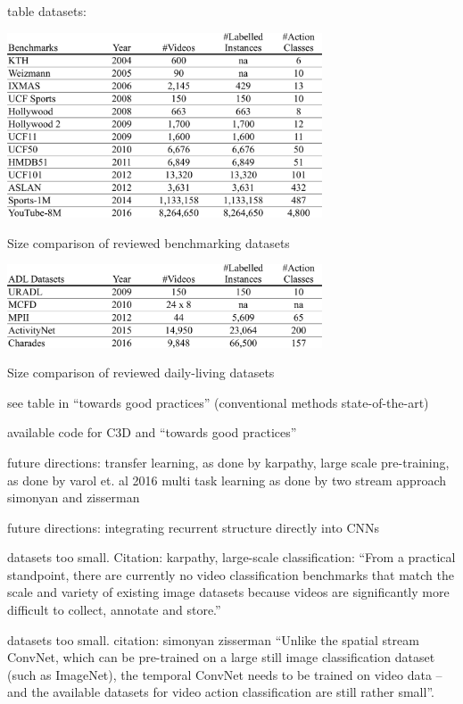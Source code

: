 table datasets:
\begin{table}
    \centering
    \includegraphics[width=0.7\textwidth]{img_evaluation/benchmarks_results}
    \caption{Size comparison of reviewed benchmarking datasets}
    \label{tab:benchmarks_results}
\end{table}

\begin{table}
    \centering
    \includegraphics[width=0.7\textwidth]{img_evaluation/adl_results}
    \caption{Size comparison of reviewed daily-living datasets}
    \label{tab:adl_results}
\end{table}

see table in ``towards good practices'' (conventional methods state-of-the-art)

available code for C3D and ``towards good practices''

future directions: transfer learning, as done by karpathy, large scale
pre-training, as done by varol et. al 2016
multi task learning as done by two stream approach simonyan and zisserman

future directions: integrating recurrent structure directly into CNNs 

datasets too small. Citation: karpathy, large-scale classification: ``From a practical standpoint, there are currently no video classification benchmarks that match the scale and variety of existing image datasets because videos are significantly more difficult to collect, annotate and store.''

datasets too small. citation: simonyan zisserman ``Unlike the spatial stream ConvNet, which can be pre-trained on a large still image classification dataset (such as ImageNet), the temporal ConvNet needs to be trained on video data – and the available datasets for video action classification are still rather small''.

